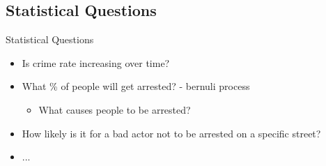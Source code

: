 \subsection{Statistical Questions}\label{subsection}
Statistical Questions

\begin{itemize}
    \item Is crime rate increasing over time?
    \item What \% of people will get arrested? - bernuli process
    \begin{itemize}
        \item What causes people to be arrested?
    \end{itemize}
    \item How likely is it for a bad actor not to be arrested on a specific street?
    \item ...
\end{itemize}